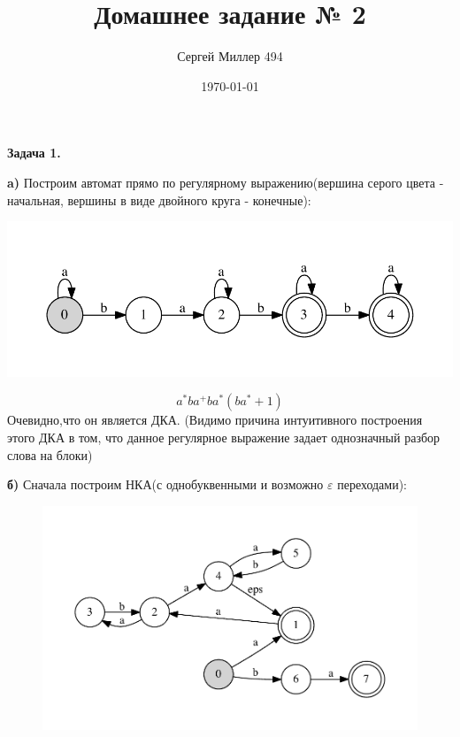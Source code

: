 \documentclass[12pt]{article}
\title{Домашнее задание № 2}
\date{\today}
\author{Сергей Миллер 494}
\begin{document}
 	\maketitle
	\textbf{Задача 1.}
 	
  	\textbf{a)}
      Построим автомат прямо по регулярному выражению(вершина серого цвета - начальная, вершины в виде двойного круга - конечные):

      \includegraphics{state_machine1.pdf}
    
    \begin{equation}
      a^{*}ba^{+}ba^{*}(ba^{*} + 1)
    \end{equation}
    Очевидно,что он является ДКА. (Видимо причина $\textit{интуитивного}$ построения этого ДКА в том, что данное регулярное выражение задает однозначный разбор слова на блоки)
 	
    \textbf{б)}
      Сначала построим НКА(с однобуквенными и возможно $\varepsilon$ переходами):

      \begin{figure}  
      \includegraphics{state_machine2.pdf}
      \end{figure}
\end{document}
